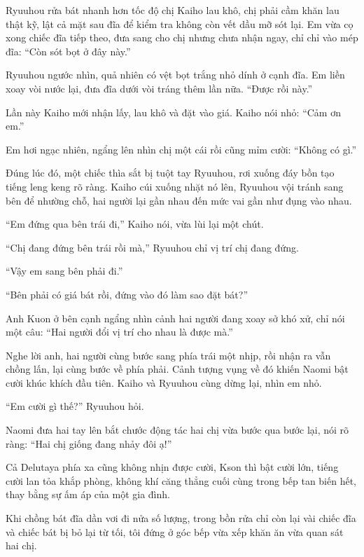 \documentclass[../main.tex]{subfiles}
\begin{document}
\ct

Ryuuhou rửa bát nhanh hơn tốc độ chị Kaiho lau khô, chị phải cầm khăn lau thật kỹ, lật cả mặt sau đĩa để kiểm tra không còn vết dầu mỡ sót lại. Em vừa cọ xong chiếc đĩa tiếp theo, đưa sang cho chị nhưng chưa nhận ngay, chỉ chỉ vào mép đĩa: ``Còn sót bọt ở đây này.''

Ryuuhou ngước nhìn, quả nhiên có vệt bọt trắng nhỏ dính ở cạnh đĩa. Em liền xoay vòi nước lại, đưa đĩa dưới vòi tráng thêm lần nữa. ``Được rồi này.''

Lần này Kaiho mới nhận lấy, lau khô và đặt vào giá. Kaiho nói nhỏ: ``Cảm ơn em.''

Em hơi ngạc nhiên, ngẩng lên nhìn chị một cái rồi cũng mỉm cười: ``Không có gì.''

Đúng lúc đó, một chiếc thìa sắt bị tuột tay Ryuuhou, rơi xuống đáy bồn tạo tiếng leng keng rõ ràng. Kaiho cúi xuống nhặt nó lên, Ryuuhou vội tránh sang bên để nhường chỗ, hai người lại gần nhau đến mức vai gần như đụng vào nhau.

``Em đứng qua bên trái đi,'' Kaiho nói, vừa lùi lại một chút.

``Chị đang đứng bên trái rồi mà,'' Ryuuhou chỉ vị trí chị đang đứng.

``Vậy em sang bên phải đi.''

``Bên phải có giá bát rồi, đứng vào đó làm sao đặt bát?''

Anh Kuon ở bên cạnh ngẩng nhìn cảnh hai người đang xoay sở khó xử, chỉ nói một câu: ``Hai người đổi vị trí cho nhau là được mà.''

Nghe lời anh, hai người cùng bước sang phía trái một nhịp, rồi nhận ra vẫn chồng lấn, lại cùng bước về phía phải. Cảnh tượng vụng về đó khiến Naomi bật cười khúc khích đầu tiên. Kaiho và Ryuuhou cùng dừng lại, nhìn em nhỏ.

``Em cười gì thế?'' Ryuuhou hỏi.

Naomi đưa hai tay lên bắt chước động tác hai chị vừa bước qua bước lại, nói rõ ràng: ``Hai chị giống đang nhảy đôi ạ!''

Cả Delutaya phía xa cũng không nhịn được cười, Kson thì bật cười lớn, tiếng cười lan tỏa khắp phòng, không khí căng thẳng cuối cùng trong bếp tan biến hết, thay bằng sự ấm áp của một gia đình.

\ct

Khi chồng bát đĩa dần vơi đi nửa số lượng, trong bồn rửa chỉ còn lại vài chiếc đĩa và chiếc bát bị bỏ lại từ tối, tôi đứng ở góc bếp vừa xếp khăn ăn vừa quan sát hai chị.
\end{document}

